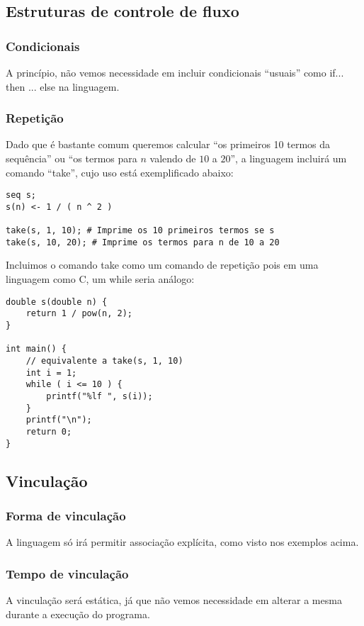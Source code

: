 \documentclass[a4 paper, 12pt]{article}
\begin{document}
\subsection{Estruturas de controle de fluxo}
\subsubsection{Condicionais}
A princ\'ipio, n\~ao vemos necessidade em incluir condicionais
``usuais'' como if... then ... else na linguagem.

\subsubsection{Repeti\c c\~ao}
Dado que \'e bastante comum queremos calcular ``os primeiros 10
termos da sequ\^encia'' ou ``os termos para $n$ valendo de $10$ a
$20$'', a linguagem incluir\'a um comando ``take'', cujo uso est\'a
exemplificado abaixo:
\begin{verbatim}
seq s;
s(n) <- 1 / ( n ^ 2 )

take(s, 1, 10); # Imprime os 10 primeiros termos se s
take(s, 10, 20); # Imprime os termos para n de 10 a 20
\end{verbatim}

Incluimos o comando take como um comando de repeti\c c\~ao pois em uma
linguagem como C, um while seria an\'alogo:
\begin{verbatim}
double s(double n) {
    return 1 / pow(n, 2);
}

int main() {
    // equivalente a take(s, 1, 10)
    int i = 1;
    while ( i <= 10 ) {
        printf("%lf ", s(i));
    }
    printf("\n");
    return 0;
}
\end{verbatim}
\subsection{Vincula\c c\~ao}
\subsubsection{Forma de vincula\c c\~ao}
A linguagem s\'o ir\'a permitir associa\c c\~ao expl\'icita, como
visto nos exemplos acima.

\subsubsection{Tempo de vincula\c c\~ao}
A vincula\c c\~ao ser\'a est\'atica, j\'a que n\~ao vemos necessidade
em alterar a mesma durante a execu\c c\~ao do programa.
\end{document}
